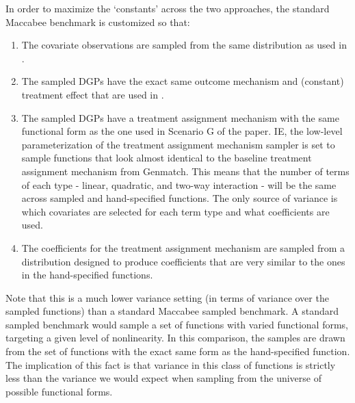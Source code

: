 \documentclass[../main.tex]{subfiles}
\begin{document}
In order to maximize the `constants' across the two approaches, the standard Maccabee benchmark is customized so that:

\begin{enumerate}
    \item The covariate observations are sampled from the same distribution as used in \textcite{Diamond2013GeneticStudies}.
    
    \item The sampled DGPs have the exact same outcome mechanism and (constant) treatment effect that are used in \textcite{Diamond2013GeneticStudies}.
    
    \item The sampled DGPs have a treatment assignment mechanism with the same functional form as the one used in Scenario G of the paper. IE, the low-level parameterization of the treatment assignment mechanism sampler is set to sample functions that look almost identical to the baseline treatment assignment mechanism from Genmatch. This means that the number of terms of each type - linear, quadratic, and two-way interaction - will be the same across sampled and hand-specified functions. The only source of variance is which covariates are selected for each term type and what coefficients are used. 
    
    \item The coefficients for the treatment assignment mechanism are sampled from a distribution designed to produce coefficients that are very similar to the ones in the hand-specified functions.
\end{enumerate}

Note that this is a much lower variance setting (in terms of variance over the sampled functions) than a standard Maccabee sampled benchmark. A standard sampled benchmark would sample a set of functions with varied functional forms, targeting a given level of nonlinearity. In this comparison, the samples are drawn from the set of functions with the exact same form as the hand-specified function. The implication of this fact is that variance in this class of functions is strictly less than the variance we would expect when sampling from the universe of possible functional forms.

\vspace{\baselineskip}
\end{document}
